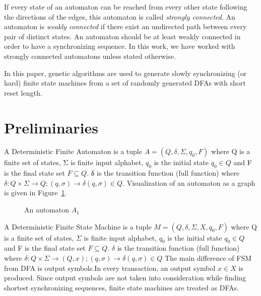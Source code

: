\documentclass[runningheads]{llncs}
\begin{document}
\par If every state of an automaton can be reached from every other state following the directions of the edges, this automaton is called \textit{strongly connected}. An automaton is \textit{weakly connected} if there exist an undirected path between every pair of distinct states. An automaton should be at least weakly connected in order to have a synchronizing sequence. In this work, we have worked with strongly connected automatons unless stated otherwise. \par In this paper, genetic algorithms are used to generate slowly synchronizing (or hard) finite state machines from a set of randomly generated DFAs with short reset length.

\section{Preliminaries}
\par A Deterministic Finite Automaton is a tuple $A = (Q,\delta, \Sigma, q_{0}, F)$ where Q is a finite set of states, Σ is finite input alphabet,  $q_{0}$ is the initial state $ q_{0} \in Q $ and F is the final state set $F \subseteq Q $. δ
is the transition function (full function) where $\delta: Q \times \Sigma \rightarrow Q ; (q,\sigma) \rightarrow \delta (q,\sigma) \in Q  $. Visualization of an automaton as a graph is given in Figure~\ref{fig:A0}.

\begin{figure}[ht]
	\centering
		\centering
{}
\caption{An automaton $A_1$}\label{fig:A0}
\end{figure}
\par A Deterministic Finite State Machine is a tuple $M = (Q,\delta, \Sigma, X, q_{0}, F)$ where Q is a finite set of states, $\Sigma$ is finite input alphabet,  $q_{0}$ is the initial state $ q_{0} \in Q $ and F is the final state set $F \subseteq Q $. $\delta$
is the transition function (full function) where $\delta: Q \times \Sigma \rightarrow (Q, x) ; (q,\sigma) \rightarrow \delta (q,\sigma) \in Q  $ The main difference of FSM from DFA is output symbols.In every transaction, an output symbol $x \in X$ is produced. Since output symbols are not taken into consideration while finding shortest synchronizing sequences, finite state machines are treated as DFAs.
\end{document}
